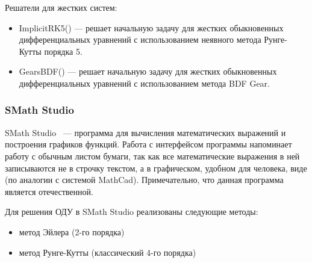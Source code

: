 Решатели для жестких систем:
\begin{itemize}
    \item ImplicitRK5() — решает начальную задачу для жестких обыкновенных дифференциальных уравнений с использованием неявного метода Рунге-Кутты порядка 5.
    \item GearsBDF() — решает начальную задачу для жестких обыкновенных дифференциальных уравнений с использованием метода BDF Gear.
\end{itemize}

\subsubsection{SMath Studio}

SMath Studio ~--- программа для вычисления математических выражений и построения графиков функций. Работа с интерфейсом программы напоминает работу с обычным листом бумаги, так как все математические выражения в ней записываются не в строчку текстом, а в графическом, удобном для человека, виде (по аналогии с системой MathCad). Примечательно, что данная программа является отечественной.

Для решения ОДУ в SMath Studio реализованы следующие методы:

\begin{itemize}
    \item метод Эйлера (2-го порядка)
    \item метод Рунге-Кутты (классический 4-го порядка)
\end{itemize}

